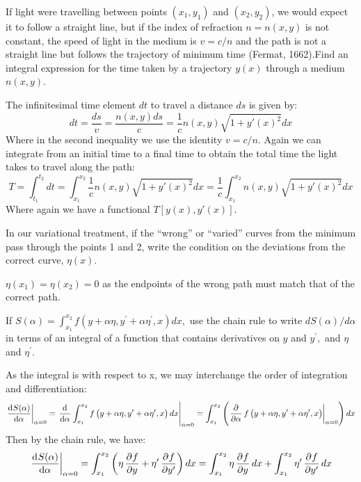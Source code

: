 \begin{p}
If light were travelling between points $(x_1,y_1)$ and $(x_2,y_2)$, we would expect it to follow a straight line, but if the index of refraction $n = n(x,y)$ is not constant, the speed of light in the medium is $v = c/n$ and the path is not a straight line but follows the trajectory of minimum time (Fermat, 1662).Find an integral expression for the time taken by a trajectory $y(x)$ through a medium $n(x,y)$.
\end{p}
\begin{s}
The infinitesimal time element $dt$ to travel a distance $ds$ is given by:
\[dt = \frac{ds}{v} = \frac{n(x,y) ds}{c} = \frac{1}{c} n(x,y)\sqrt{1 + y'(x)^2}dx \]
Where in the second inequality we use the identity $v = c/n$. Again we can integrate from an initial time to a final time to obtain the total time the light takes to travel along the path:
\[T = \int_{t_1}^{t_2} dt = \int_{x_1}^{x_2} \frac{1}{c} n(x,y)\sqrt{1 + y'(x)^2}dx = \frac{1}{c}\int_{x_1}^{x_2} n(x,y) \sqrt{1+y'(x)^2}dx\]
Where again we have a functional $T[y(x), y'(x)]$.
\end{s}

\begin{p}
In our variational treatment, if the “wrong” or “varied” curves from the minimum pass through the points 1 and 2, write the condition on the deviations from the correct curve, $\eta(x)$.
\end{p}
\begin{s}
$\eta(x_1) = \eta(x_2) = 0$ as the endpoints of the wrong path must match that of the correct path. 
\end{s}

\begin{p}
If $S(\alpha)=\int_{x_{1}}^{x_{2}} f\left(y+\alpha \eta, y^{\prime}+\alpha \eta^{\prime}, x\right) d x,$ use the chain rule to write $d S(\alpha) / d \alpha$ in terms of an integral of a function that contains derivatives on $y$ and $y^{\prime},$ and $\eta$ and $\eta^{\prime}$.
\end{p}
\begin{s}
As the integral is with respect to x, we may interchange the order of integration and differentiation:
\[\left. \dod{S(\alpha)}{\alpha}\right|_{\alpha = 0} = \left.\dod{}{\alpha}\int_{x_{1}}^{x_{2}} f\left(y+\alpha \eta, y^{\prime}+\alpha \eta^{\prime}, x\right) dx\right|_{\alpha = 0} = \int_{x_1}^{x_2} \left(\left.\dpd{}{\alpha}f\left(y+\alpha \eta, y^{\prime}+\alpha \eta^{\prime}, x\right)\right|_{\alpha = 0}\right) dx \]
Then by the chain rule, we have:
\[\left.\dod{S(\alpha)}{\alpha}\right|_{\alpha = 0} = \int_{x_{1}}^{x_{2}} \left(\eta\dpd{f}{y} + \eta'\dpd{f}{y'}\right)dx = \int_{x_1}^{x_2} \eta\dpd{f}{y} dx + \int_{x_1}^{x_2} \eta'\dpd{f}{y'}dx\]
\end{s}

